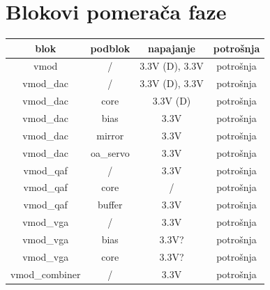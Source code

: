 \documentclass[journal,twocolumn,letterpaper]{IEEEJERM}
\begin{document}

\section{Blokovi pomerača faze}


\begin{center}
  \begin{tabular}{| c | c | c | c |}
    \hline
    blok & podblok & napajanje & potrošnja \\
    \hline
    \hline
    vmod & / & 3.3V (D), 3.3V & potrošnja \\
    \hline
    vmod\_dac & / & 3.3V (D), 3.3V & potrošnja \\
    \hline
    vmod\_dac & core & 3.3V (D) & potrošnja \\ 
    \hline
    vmod\_dac & bias & 3.3V & potrošnja \\
    \hline
    vmod\_dac  & mirror & 3.3V & potrošnja \\
    \hline
    vmod\_dac & oa\_servo & 3.3V & potrošnja\\
    \hline
    vmod\_qaf & / & 3.3V & potrošnja\\
    \hline
    vmod\_qaf & core &  / & potrošnja\\
    \hline
    vmod\_qaf & buffer & 3.3V & potrošnja\\
    \hline
    vmod\_vga &  / & 3.3V & potrošnja\\
    \hline
    vmod\_vga & bias & 3.3V? & potrošnja \\
    \hline
    vmod\_vga & core & 3.3V? & potrošnja \\
    \hline
    vmod\_combiner & / & 3.3V & potrošnja \\
    \hline
  \end{tabular}
\end{center}
\end{document}
